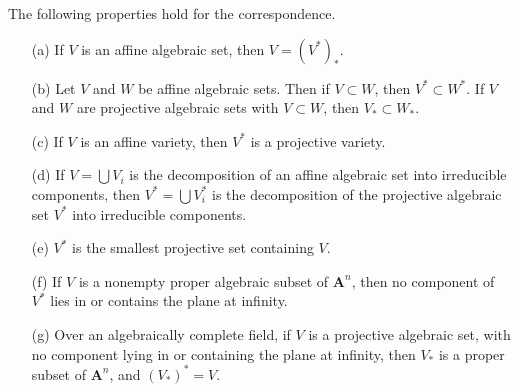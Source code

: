 \begin{theorem}
    The following properties hold for the correspondence.
    \begin{enumerate}
        \item[(a)] If $V$ is an affine algebraic set, then $V = (V^*)_*$.
        \item[(b)] Let $V$ and $W$ be affine algebraic sets. Then if $V \subset W$, then $V^* \subset W^*$. If $V$ and $W$ are projective algebraic sets with $V \subset W$, then $V_* \subset W_*$.
        \item[(c)] If $V$ is an affine variety, then $V^*$ is a projective variety.
        \item[(d)] If $V = \bigcup V_i$ is the decomposition of an affine algebraic set into irreducible components, then $V^* = \bigcup V_i^*$ is the decomposition of the projective algebraic set $V^*$ into irreducible components.
        \item[(e)] $V^*$ is the smallest projective set containing $V$.
        \item[(f)] If $V$ is a nonempty proper algebraic subset of $\mathbf{A}^n$, then no component of $V^*$ lies in or contains the plane at infinity.
        \item[(g)] Over an algebraically complete field, if $V$ is a projective algebraic set, with no component lying in or containing the plane at infinity, then $V_*$ is a proper subset of $\mathbf{A}^n$, and $(V_*)^* = V$.
    \end{enumerate}
\end{theorem}
